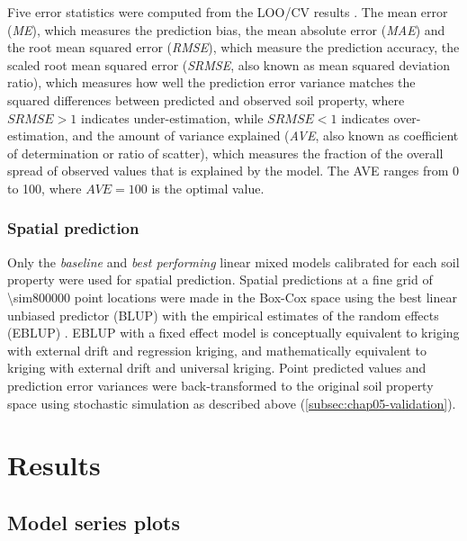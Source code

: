 Five error statistics were computed from the LOO\-/CV results \cite{JanssenEtAl1995, KempenEtAl2010, 
BrusEtAl2011}. The mean error (\textit{ME}), which measures the prediction bias, the mean absolute error 
(\textit{MAE}) and the root mean squared error (\textit{RMSE}), which measure the prediction accuracy, the 
scaled root mean squared error (\textit{SRMSE}, also known as mean squared deviation ratio), which measures 
how 
well the prediction error variance matches the squared differences between predicted and observed soil 
property, where $\textit{SRMSE} > 1$ indicates under-estimation, while $\textit{SRMSE} < 1$ indicates 
over-estimation, and the amount of variance explained (\textit{AVE}, also known as coefficient of 
determination 
or ratio of scatter), which measures the fraction of the overall spread of observed values that is explained 
by 
the model. The AVE ranges from \num{0} to \num{100}, where $\textit{AVE} = 100$ is the optimal value.

\subsubsection*{Spatial prediction}
\label{subsec:chap05-prediction}

Only the \emph{baseline} and \emph{best performing} linear mixed models calibrated for each soil property were 
used for spatial prediction. Spatial predictions at a fine grid of \num{\sim800000} point locations were made 
in the Box-Cox space using the best linear unbiased predictor (BLUP) with the empirical estimates of the 
random 
effects (EBLUP) \cite{LarkEtAl2006}. EBLUP with a fixed effect model is conceptually equivalent to kriging 
with 
external drift and regression kriging, and mathematically equivalent to kriging with external drift and 
universal kriging. Point predicted values and prediction error variances were back-transformed to the original 
soil property space using stochastic simulation as described above (\autoref{subsec:chap05-validation}).

\section{Results}
\label{sec:chap05-results}

\subsection{Model series plots}

